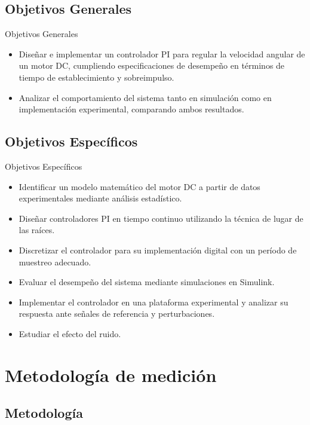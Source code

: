 \documentclass[mathserif,spanish]{beamer}
\begin{document}
\subsection{Objetivos Generales}
\begin{frame}{Objetivos Generales}
\begin{itemize}
    \item Diseñar e implementar un controlador PI para regular la velocidad angular de un motor DC, cumpliendo especificaciones de desempeño en términos de tiempo de establecimiento y sobreimpulso.
    \item Analizar el comportamiento del sistema tanto en simulación como en implementación experimental, comparando ambos resultados.
\end{itemize}
\end{frame}

\subsection{Objetivos Específicos}
    \begin{frame}{Objetivos Específicos}
\begin{itemize}
    \item Identificar un modelo matemático del motor DC a partir de datos experimentales mediante análisis estadístico.
    \item Diseñar controladores PI en tiempo continuo utilizando la técnica de lugar de las raíces.
    \item Discretizar el controlador para su implementación digital con un período de muestreo adecuado.
    \item Evaluar el desempeño del sistema mediante simulaciones en Simulink.
    \item Implementar el controlador en una plataforma experimental y analizar su respuesta ante señales de referencia y perturbaciones.
    \item Estudiar el efecto del ruido.
\end{itemize}
\end{frame}   %

\section{Metodología de medición}   %
    \subsection{Metodología}
\end{document}
